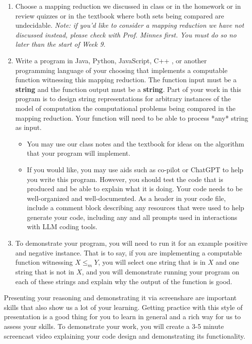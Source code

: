 \begin{enumerate}
\item Choose a mapping reduction we discussed in class or in the homework
or in review quizzes or in the textbook where both sets being compared are 
undecidable. {\it Note:
if you'd like to consider a  mapping reduction we have not discussed instead, 
please check with Prof. Minnes first. 
You must do so no later than the start of Week 9.}
\item Write a program in Java, Python, JavaScript, C++ , or another programming language of your choosing that implements a computable function witnessing this mapping reduction.  The function input must be a {\bf string}  and the function 
output must be a {\bf string}. Part of your work in this program 
is to design string representations for arbitrary instances of the model of 
computation the computational problems being compared in the mapping reduction.
Your function will need to be able to process *any* string as input.
\begin{itemize}
   \item You may use our class notes and the textbook for ideas on the algorithm that your program will implement.
   \item If you would like, you may use aids such as co-pilot or ChatGPT to help you write this program. 
   However, you should test the code that is produced and be able to explain what it is doing. Your code needs to be well-organized and well-documented.
   As a header in your code file, include a comment block describing any resources that were used to 
   help generate your code, including any and all prompts used in interactions 
   with LLM coding tools.
\end{itemize}

\item To demonstrate your program, you will need to run it for an example positive and negative instance. That is to say, if you are implementing 
a computable function witnessing $X \leq_m Y$, you will select one string that is in $X$ and one string that is not in $X$, and you will 
 demonstrate running your program on each of these strings and explain why 
 the output of the function is good.
\end{enumerate}

Presenting your reasoning and demonstrating it via screenshare are important 
skills that also  show us a lot of your learning. Getting practice with this 
style of presentation is a good thing  for you to learn in general and a rich 
way for us to assess your skills. 
To demonstrate your work, you will create a 3-5 minute screencast video 
explaining your code design and demonstrating its functionality.


